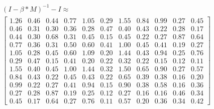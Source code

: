 \begin{gather}
	\nonumber (I - \beta * M)^{-1} - I \approx\\
	 \begin{bmatrix}
		1.26 & 0.46 & 0.44 & 0.77 & 1.05 & 0.29 & 1.55 & 0.84 & 0.99 & 0.27 & 0.45\\
		0.46 & 0.31 & 0.30 & 0.36 & 0.28 & 0.47 & 0.40 & 0.43 & 0.22 & 0.28 & 0.17\\
		0.44 & 0.30 & 0.68 & 0.31 & 0.45 & 0.15 & 0.45 & 0.22 & 0.27 & 0.87 & 0.64\\
		0.77 & 0.36 & 0.31 & 0.50 & 0.60 & 0.41 & 1.00 & 0.45 & 0.41 & 0.19 & 0.27\\
		1.05 & 0.28 & 0.45 & 0.60 & 1.09 & 0.20 & 1.44 & 0.43 & 0.94 & 0.25 & 0.76\\
		0.29 & 0.47 & 0.15 & 0.41 & 0.20 & 0.22 & 0.32 & 0.22 & 0.15 & 0.12 & 0.11\\
		1.55 & 0.40 & 0.45 & 1.00 & 1.44 & 0.32 & 1.50 & 0.65 & 0.90 & 0.27 & 0.57\\
		0.84 & 0.43 & 0.22 & 0.45 & 0.43 & 0.22 & 0.65 & 0.39 & 0.38 & 0.16 & 0.20\\
		0.99 & 0.22 & 0.27 & 0.41 & 0.94 & 0.15 & 0.90 & 0.38 & 0.58 & 0.16 & 0.36\\
		0.27 & 0.28 & 0.87 & 0.19 & 0.25 & 0.12 & 0.27 & 0.16 & 0.16 & 0.46 & 0.34\\
		0.45 & 0.17 & 0.64 & 0.27 & 0.76 & 0.11 & 0.57 & 0.20 & 0.36 & 0.34 & 0.42
	\end{bmatrix}
	\label{frml:katzZentralitaetPseudoMitarbeiter:formel5}
\end{gather}